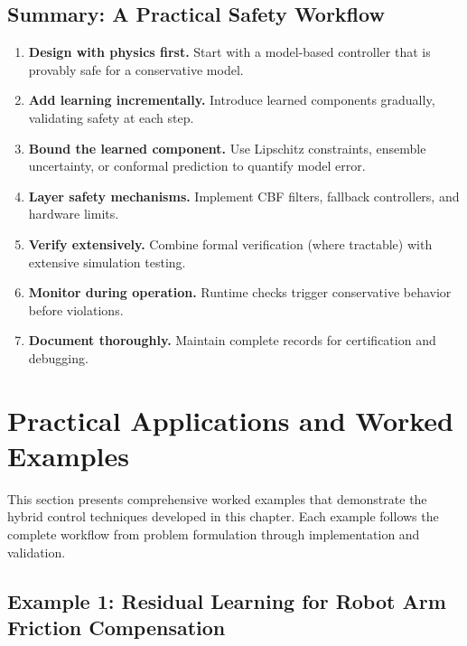 \subsection{Summary: A Practical Safety Workflow}

\begin{enumerate}
    \item \textbf{Design with physics first.} Start with a model-based controller that is provably safe for a conservative model.

    \item \textbf{Add learning incrementally.} Introduce learned components gradually, validating safety at each step.

    \item \textbf{Bound the learned component.} Use Lipschitz constraints, ensemble uncertainty, or conformal prediction to quantify model error.

    \item \textbf{Layer safety mechanisms.} Implement CBF filters, fallback controllers, and hardware limits.

    \item \textbf{Verify extensively.} Combine formal verification (where tractable) with extensive simulation testing.

    \item \textbf{Monitor during operation.} Runtime checks trigger conservative behavior before violations.

    \item \textbf{Document thoroughly.} Maintain complete records for certification and debugging.
\end{enumerate}

\section{Practical Applications and Worked Examples}
\label{sec:practical_applications}

This section presents comprehensive worked examples that demonstrate the hybrid control techniques developed in this chapter. Each example follows the complete workflow from problem formulation through implementation and validation.

\subsection{Example 1: Residual Learning for Robot Arm Friction Compensation}
\label{ex:robot_arm_residual}

